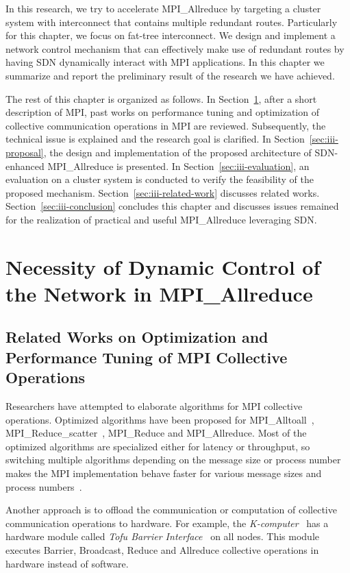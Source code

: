 In this research, we try to accelerate MPI\_Allreduce by targeting a cluster
system with interconnect that contains multiple redundant routes. Particularly
for this chapter, we focus on fat-tree interconnect. We design and implement a
network control mechanism that can effectively make use of redundant routes by
having SDN dynamically interact with MPI applications. In this chapter we
summarize and report the preliminary result of the research we have achieved.

The rest of this chapter is organized as follows. In
Section~\ref{sec:iii-background},
after a short description of MPI, past works on performance tuning and
optimization of collective communication operations in MPI are reviewed.
Subsequently, the technical issue is explained and the research goal is
clarified. In Section~\ref{sec:iii-proposal}, the design and
implementation of the proposed architecture of SDN-enhanced MPI\_Allreduce is
presented. In Section~\ref{sec:iii-evaluation}, an evaluation on a cluster system is
conducted to verify the feasibility of the proposed mechanism.
Section~\ref{sec:iii-related-work} discusses related works.
Section~\ref{sec:iii-conclusion} concludes this chapter and discusses issues
remained for the realization of practical and useful MPI\_Allreduce leveraging
SDN\@.

\section{Necessity of Dynamic Control of the Network in
MPI\_Allreduce}\label{sec:iii-background}

\subsection{Related Works on Optimization and Performance Tuning of MPI
Collective Operations}

Researchers have attempted to elaborate algorithms for MPI collective
operations. Optimized algorithms have been proposed for
MPI\_Alltoall~\autocite{Bruck1997}, MPI\_Reduce\_scatter~\autocite{Iannello1997},
MPI\_Reduce and MPI\_Allreduce. Most of the optimized
algorithms are specialized either for latency or throughput, so switching
multiple algorithms depending on the message size or process number makes the
MPI implementation behave faster for various message sizes and process
numbers~\autocite{Thakur2005}.

Another approach is to offload the communication or computation of
collective communication operations to hardware. For example, the
\emph{K-computer}~\autocite{Yokokawa2011} has a hardware module called \emph{Tofu
Barrier Interface}~\autocite{Ajima2012} on all nodes. This module executes
Barrier, Broadcast, Reduce and Allreduce collective operations in hardware
instead of software.


